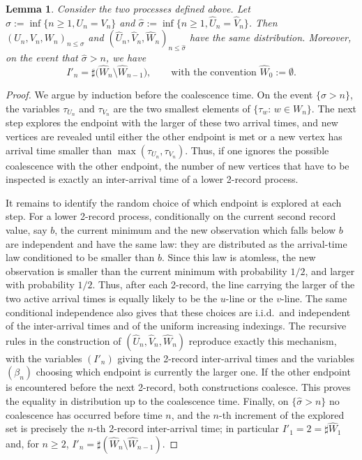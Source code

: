 \documentclass[french]{article}
\newtheorem{lemma}[theorem]{Lemma}
\renewcommand{\1}{\mathds{1}}
\begin{document}
\begin{lemma}\label{lem:memeloi} Consider the two processes defined above. Let $\sigma:=\inf\{n\ge 1, U_n=V_n\}$ and $\hat{\sigma}:=\inf\{n\ge 1, \hat{U}_n=\hat{V}_n\}$. Then $(U_n,V_n,W_n)_{n\le \sigma}$ and $(\hat{U}_n,\hat{V}_n,\hat{W}_n)_{n\le \hat{\sigma}}$ have the same distribution. Moreover, on the event that $\hat{\sigma} > n$, we have
\[
I'_n = \sharp\bigl(\hat{W}_n \setminus \hat{W}_{n-1}\bigr),
\qquad \text{with the convention } \hat{W}_0 := \emptyset.
\]
\end{lemma}

\begin{proof}
We argue by induction before the coalescence time. On the event $\{\sigma>n\}$, the variables $\tau_{U_n}$ and $\tau_{V_n}$ are the two smallest elements of $\{\tau_w:\, w\in W_n\}$. The next step explores the endpoint with the larger of these two arrival times, and new vertices are revealed until either the other endpoint is met or a new vertex has arrival time smaller than $\max(\tau_{U_n},\tau_{V_n})$. Thus, if one ignores the possible coalescence with the other endpoint, the number of new vertices that have to be inspected is exactly an inter-arrival time of a lower 2-record process.

It remains to identify the random choice of which endpoint is explored at each step. For a lower 2-record process, conditionally on the current second record value, say $b$, the current minimum and the new observation which falls below $b$ are independent and have the same law: they are distributed as the arrival-time law conditioned to be smaller than $b$. Since this law is atomless, the new observation is smaller than the current minimum with probability $1/2$, and larger with probability $1/2$. Thus, after each 2-record, the line carrying the larger of the two active arrival times is equally likely to be the $u$-line or the $v$-line. The same conditional independence also gives that these choices are i.i.d.\ and independent of the inter-arrival times and of the uniform increasing indexings. The recursive rules in the construction of $(\hat{U}_n,\hat{V}_n,\hat{W}_n)$ reproduce exactly this mechanism, with the variables $(I'_n)$ giving the 2-record inter-arrival times and the variables $(\beta_n)$ choosing which endpoint is currently the larger one. If the other endpoint is encountered before the next 2-record, both constructions coalesce. This proves the equality in distribution up to the coalescence time. Finally, on $\{\hat{\sigma}>n\}$ no coalescence has occurred before time $n$, and the $n$-th increment of the explored set is precisely the $n$-th 2-record inter-arrival time; in particular $I'_1=2=\sharp\hat{W}_1$ and, for $n\ge2$, $I'_n=\sharp(\hat{W}_n\setminus\hat{W}_{n-1})$.
\end{proof}
\end{document}
